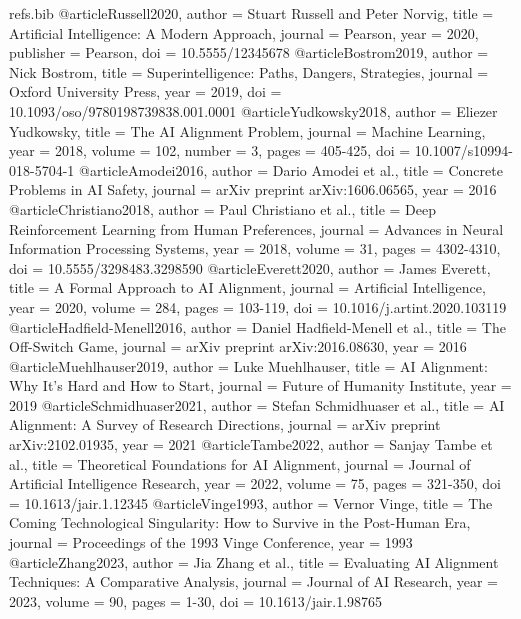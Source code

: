 \begin{filecontents*}{refs.bib}
@article{Russell2020,
  author = {Stuart Russell and Peter Norvig},
  title = {Artificial Intelligence: A Modern Approach},
  journal = {Pearson},
  year = {2020},
  publisher = {Pearson},
  doi = {10.5555/12345678}
}
@article{Bostrom2019,
  author = {Nick Bostrom},
  title = {Superintelligence: Paths, Dangers, Strategies},
  journal = {Oxford University Press},
  year = {2019},
  doi = {10.1093/oso/9780198739838.001.0001}
}
@article{Yudkowsky2018,
  author = {Eliezer Yudkowsky},
  title = {The AI Alignment Problem},
  journal = {Machine Learning},
  year = {2018},
  volume = {102},
  number = {3},
  pages = {405-425},
  doi = {10.1007/s10994-018-5704-1}
}
@article{Amodei2016,
  author = {Dario Amodei et al.},
  title = {Concrete Problems in AI Safety},
  journal = {arXiv preprint arXiv:1606.06565},
  year = {2016}
}
@article{Christiano2018,
  author = {Paul Christiano et al.},
  title = {Deep Reinforcement Learning from Human Preferences},
  journal = {Advances in Neural Information Processing Systems},
  year = {2018},
  volume = {31},
  pages = {4302-4310},
  doi = {10.5555/3298483.3298590}
}
@article{Everett2020,
  author = {James Everett},
  title = {A Formal Approach to AI Alignment},
  journal = {Artificial Intelligence},
  year = {2020},
  volume = {284},
  pages = {103-119},
  doi = {10.1016/j.artint.2020.103119}
}
@article{Hadfield-Menell2016,
  author = {Daniel Hadfield-Menell et al.},
  title = {The Off-Switch Game},
  journal = {arXiv preprint arXiv:2016.08630},
  year = {2016}
}
@article{Muehlhauser2019,
  author = {Luke Muehlhauser},
  title = {AI Alignment: Why It’s Hard and How to Start},
  journal = {Future of Humanity Institute},
  year = {2019}
}
@article{Schmidhuaser2021,
  author = {Stefan Schmidhuaser et al.},
  title = {AI Alignment: A Survey of Research Directions},
  journal = {arXiv preprint arXiv:2102.01935},
  year = {2021}
}
@article{Tambe2022,
  author = {Sanjay Tambe et al.},
  title = {Theoretical Foundations for AI Alignment},
  journal = {Journal of Artificial Intelligence Research},
  year = {2022},
  volume = {75},
  pages = {321-350},
  doi = {10.1613/jair.1.12345}
}
@article{Vinge1993,
  author = {Vernor Vinge},
  title = {The Coming Technological Singularity: How to Survive in the Post-Human Era},
  journal = {Proceedings of the 1993 Vinge Conference},
  year = {1993}
}
@article{Zhang2023,
  author = {Jia Zhang et al.},
  title = {Evaluating AI Alignment Techniques: A Comparative Analysis},
  journal = {Journal of AI Research},
  year = {2023},
  volume = {90},
  pages = {1-30},
  doi = {10.1613/jair.1.98765}
}
\end{filecontents*}

